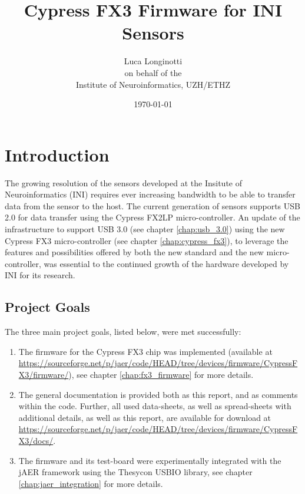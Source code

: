 \documentclass[a4paper,12pt]{report}
\begin{document}
\title{Cypress FX3 Firmware for INI Sensors}

\author{Luca Longinotti\\on behalf of the\\Institute of Neuroinformatics, UZH/ETHZ}

\date{\today}

\maketitle

\tableofcontents{}
\clearpage

\chapter{Introduction} \label{chap:introduction}

The growing resolution of the sensors developed at the Insitute of Neuroinformatics (INI) requires ever increasing bandwidth to be able to transfer data from the sensor to the host. The current generation of sensors supports USB 2.0 for data transfer using the Cypress FX2LP micro-controller. An update of the infrastructure to support USB 3.0 (see chapter \ref{chap:usb_3.0}) using the new Cypress FX3 micro-controller (see chapter \ref{chap:cypress_fx3}), to leverage the features and possibilities offered by both the new standard and the new micro-controller, was essential to the continued growth of the hardware developed by INI for its research.

\section{Project Goals} \label{sec:project_goals}

The three main project goals, listed below, were met successfully:

\begin{enumerate}
\item The firmware for the Cypress FX3 chip was implemented (available at \url{https://sourceforge.net/p/jaer/code/HEAD/tree/devices/firmware/CypressFX3/firmware/}), see chapter \ref{chap:fx3_firmware} for more details.
\item The general documentation is provided both as this report, and as comments within the code. Further, all used data-sheets, as well as spread-sheets with additional details, as well as this report, are available for download at \url{https://sourceforge.net/p/jaer/code/HEAD/tree/devices/firmware/CypressFX3/docs/}.
\item The firmware and its test-board were experimentally integrated with the jAER framework using the Thesycon USBIO library, see chapter \ref{chap:jaer_integration} for more details.
\end{enumerate}
\end{document}
